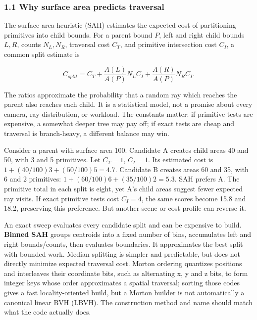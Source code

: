 \subsubsection{1.1 Why surface area predicts traversal}\label{05-engine-i-ch008-why-surface-area-predicts-traversal}

\hypertarget{05-engine-i-ch008-why-surface-area-predicts-traversal}{}

The surface area heuristic (SAH) estimates the expected cost of partitioning primitives into child bounds. For a parent bound \(P\), left and right child bounds \(L,R\), counts \(N_L,N_R\), traversal cost \(C_T\), and primitive intersection cost \(C_I\), a common split estimate is

\[C_{split}=C_T+\frac{A(L)}{A(P)}N_LC_I+\frac{A(R)}{A(P)}N_RC_I.\]

The ratios approximate the probability that a random ray which reaches the parent also reaches each child. It is a statistical model, not a promise about every camera, ray distribution, or workload. The constants matter: if primitive tests are expensive, a somewhat deeper tree may pay off; if exact tests are cheap and traversal is branch-heavy, a different balance may win.

Consider a parent with surface area 100. Candidate A creates child areas 40 and 50, with 3 and 5 primitives. Let \(C_T=1\), \(C_I=1\). Its estimated cost is \(1+(40/100)3+(50/100)5=4.7\). Candidate B creates areas 60 and 35, with 6 and 2 primitives: \(1+(60/100)6+(35/100)2=5.3\). SAH prefers A. The primitive total in each split is eight, yet A's child areas suggest fewer expected ray visits. If exact primitive tests cost \(C_I=4\), the same scores become 15.8 and 18.2, preserving this preference. But another scene or cost profile can reverse it.

An exact sweep evaluates every candidate split and can be expensive to build. \textbf{Binned SAH} groups centroids into a fixed number of bins, accumulates left and right bounds/counts, then evaluates boundaries. It approximates the best split with bounded work. Median splitting is simpler and predictable, but does not directly minimize expected traversal cost. Morton ordering quantizes positions and interleaves their coordinate bits, such as alternating x, y and z bits, to form integer keys whose order approximates a spatial traversal; sorting those codes gives a fast locality-oriented build, but a Morton builder is not automatically a canonical linear BVH (LBVH). The construction method and name should match what the code actually does.

